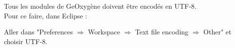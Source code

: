 Tous les modules de GeOxygène doivent être encodés en UTF-8. \\

\noindent
Pour ce faire, dans Eclipse :

Aller dans "Preferences $\Rightarrow$ Workspace $\Rightarrow$ Text file encoding $\Rightarrow$ Other"  et choisir UTF-8. 




